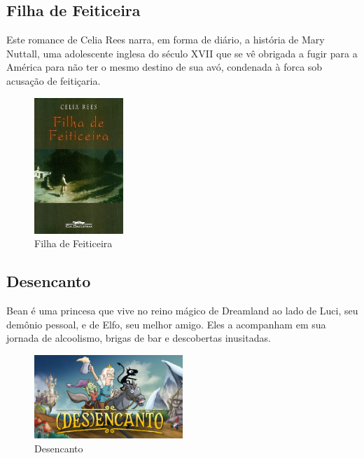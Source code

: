 \clearpage

\subsection{Filha de Feiticeira}

Este romance de Celia Rees narra, em forma de diário, a história de Mary
Nuttall, uma adolescente inglesa do século XVII que se vê obrigada a fugir para
a América para não ter o mesmo destino de sua avó, condenada à forca sob
acusação de feitiçaria.

\begin{figure}[!htb] \caption{\label{filha_feiticeira}Filha de Feiticeira}
    \begin{center}
    \includegraphics[width=0.3\textwidth]{imagens/feiticeira.jpeg} \end{center}
 \end{figure}



\subsection{Desencanto}

Bean é uma princesa que vive no reino mágico de Dreamland ao lado de Luci, seu
demônio pessoal, e de Elfo, seu melhor amigo. Eles a acompanham em sua jornada de
alcoolismo, brigas de bar e descobertas inusitadas.



\begin{figure}[!htb] \caption{\label{Desencanto}Desencanto} \begin{center}
\includegraphics[width=0.5\textwidth]{imagens/Desencanto.jpg} \end{center}
 \end{figure}

